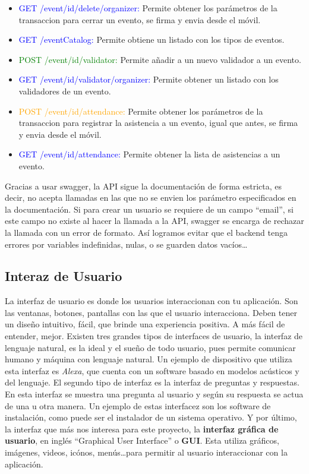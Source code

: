 \begin{itemize}
\item \textcolor{blue}{{\footnotesize GET} /event/{id}/delete/{organizer}:} Permite obtener los parámetros de la transaccion para cerrar un evento, se firma y envia desde el móvil.
\item \textcolor{blue}{{\footnotesize GET} /eventCatalog:} Permite obtiene un listado con los tipos de eventos. 
\item \textcolor{green}{{\footnotesize POST} /event/{id}/validator:} Permite añadir a un nuevo validador a un evento.
\item \textcolor{blue}{{\footnotesize GET} /event/{id}/validator/{organizer}:} Permite obtener un listado con los validadores de un evento. 
\item \textcolor{orange}{{\footnotesize POST} /event/{id}/attendance:} Permite obtener los parámetros de la transaccion para registrar la asistencia a un evento, igual que antes, se firma y envia desde el móvil. 
\item \textcolor{blue}{{\footnotesize GET} /event/{id}/attendance:} Permite obtener la lista de asistencias a un evento. 
\end{itemize}

Gracias a usar swagger, la API sigue la documentación de forma estricta, es decir, no acepta llamadas en las que no se envien los parámetro especificados en la documentación. Si para crear un usuario se requiere de un campo ``email'', si este campo no existe al hacer la llamada a la API, swagger se encarga de rechazar la llamada con un error de formato. Así logramos evitar que el backend tenga errores por variables indefinidas, nulas, o se guarden datos vacíos\dots

\subsection{Interaz de Usuario}

La interfaz de usuario es donde los usuarios interaccionan con tu aplicación. Son las ventanas, botones, pantallas con las que el usuario interacciona. Deben tener un diseño intuitivo, fácil, que brinde una experiencia positiva. A más fácil de entender, mejor. Existen tres grandes tipos de interfaces de usuario, la interfaz de lenguaje natural, es la ideal y el sueño de todo usuario, pues permite comunicar humano y máquina con lenguaje natural. Un ejemplo de dispositivo que utiliza esta interfaz es \emph{Alexa}, que cuenta con un software basado en modelos acústicos y del lenguaje. El segundo tipo de interfaz es la interfaz de preguntas y respuestas. En esta interfaz se muestra una pregunta al usuario y según su respuesta se actua de una u otra manera. Un ejemplo de estas interfacez son los software de instalación, como puede ser el instalador de un sistema operativo. Y por último, la interfaz que más nos interesa para este proyecto, la \textbf{interfaz gráfica de usuario}, en inglés ``Graphical User Interface'' o \textbf{GUI}. Esta utiliza gráficos, imágenes, videos, icónos, menús\dots para permitir al usuario interaccionar con la aplicación. 

